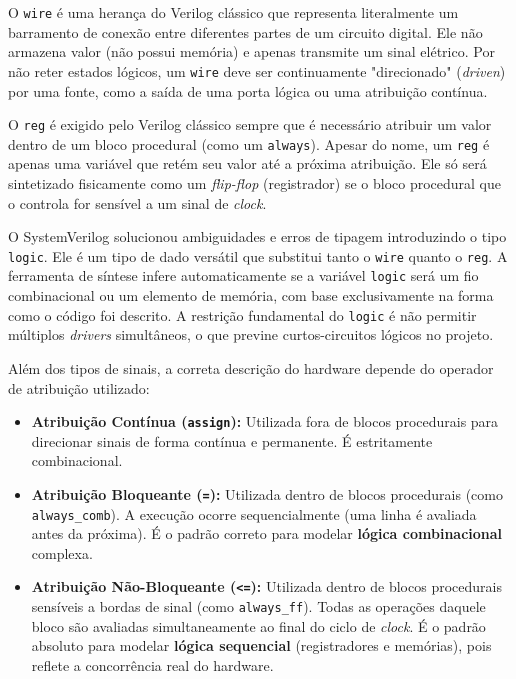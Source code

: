 \documentclass[12pt,a4paper]{article}
\begin{document}
O \texttt{wire} é uma herança do Verilog clássico que representa literalmente um barramento de conexão entre diferentes partes de um circuito digital. Ele não armazena valor (não possui memória) e apenas transmite um sinal elétrico. Por não reter estados lógicos, um \texttt{wire} deve ser continuamente "direcionado" (\textit{driven}) por uma fonte, como a saída de uma porta lógica ou uma atribuição contínua.

O \texttt{reg} é exigido pelo Verilog clássico sempre que é necessário atribuir um valor dentro de um bloco procedural (como um \texttt{always}). Apesar do nome, um \texttt{reg} é apenas uma variável que retém seu valor até a próxima atribuição. Ele só será sintetizado fisicamente como um \textit{flip-flop} (registrador) se o bloco procedural que o controla for sensível a um sinal de \textit{clock}.

O SystemVerilog solucionou ambiguidades e erros de tipagem introduzindo o tipo \texttt{logic}. Ele é um tipo de dado versátil que substitui tanto o \texttt{wire} quanto o \texttt{reg}. A ferramenta de síntese infere automaticamente se a variável \texttt{logic} será um fio combinacional ou um elemento de memória, com base exclusivamente na forma como o código foi descrito. A restrição fundamental do \texttt{logic} é não permitir múltiplos \textit{drivers} simultâneos, o que previne curtos-circuitos lógicos no projeto.

Além dos tipos de sinais, a correta descrição do hardware depende do operador de atribuição utilizado:

\begin{itemize}
    \item \textbf{Atribuição Contínua (\texttt{assign}):} Utilizada fora de blocos procedurais para direcionar sinais de forma contínua e permanente. É estritamente combinacional.
    \item \textbf{Atribuição Bloqueante (\texttt{=}):} Utilizada dentro de blocos procedurais (como \texttt{always\_comb}). A execução ocorre sequencialmente (uma linha é avaliada antes da próxima). É o padrão correto para modelar \textbf{lógica combinacional} complexa.
    \item \textbf{Atribuição Não-Bloqueante (\texttt{<=}):} Utilizada dentro de blocos procedurais sensíveis a bordas de sinal (como \texttt{always\_ff}). Todas as operações daquele bloco são avaliadas simultaneamente ao final do ciclo de \textit{clock}. É o padrão absoluto para modelar \textbf{lógica sequencial} (registradores e memórias), pois reflete a concorrência real do hardware.
\end{itemize}
\end{document}
